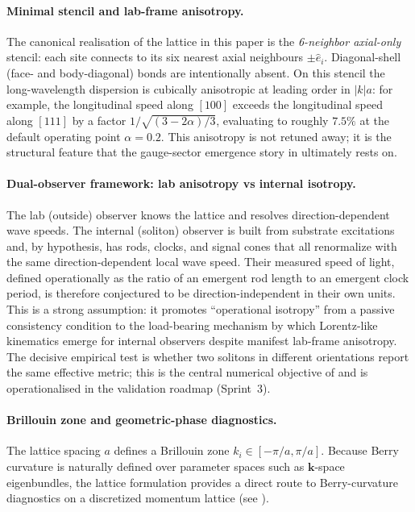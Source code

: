 \paragraph{Minimal stencil and lab-frame anisotropy.}
The canonical realisation of the lattice in this paper is the \emph{6-neighbor axial-only} stencil:
each site connects to its six nearest axial neighbours $\pm\hat{e}_i$.
Diagonal-shell (face- and body-diagonal) bonds are intentionally absent.
On this stencil the long-wavelength dispersion is cubically anisotropic at leading order in $|k|a$:
for example, the longitudinal speed along $[100]$ exceeds the longitudinal speed along $[111]$
by a factor $1/\sqrt{(3-2\alpha)/3}$, evaluating to roughly $7.5\%$ at the default operating point $\alpha=0.2$.
This anisotropy is not retuned away; it is the structural feature that the gauge-sector emergence story in
 ultimately rests on.

\paragraph{Dual-observer framework: lab anisotropy vs internal isotropy.}
\label{para:dual-observer}
The lab (outside) observer knows the lattice and resolves direction-dependent wave speeds.
The internal (soliton) observer is built from substrate excitations and, by hypothesis, has rods, clocks, and signal
cones that all renormalize with the same direction-dependent local wave speed.
Their measured speed of light, defined operationally as the ratio of an emergent rod length to an emergent clock period,
is therefore conjectured to be direction-independent in their own units.
This is a strong assumption: it promotes ``operational isotropy'' from a passive consistency condition to the
load-bearing mechanism by which Lorentz-like kinematics emerge for internal observers despite manifest lab-frame
anisotropy.
The decisive empirical test is whether two solitons in different orientations report the same effective metric;
this is the central numerical objective of  and is operationalised in the validation
roadmap (Sprint~3).

\paragraph{Brillouin zone and geometric-phase diagnostics.}
The lattice spacing $a$ defines a Brillouin zone $k_i\in[-\pi/a,\pi/a]$.
Because Berry curvature is naturally defined over parameter spaces such as $\mathbf{k}$-space eigenbundles,
the lattice formulation provides a direct route to Berry-curvature diagnostics on a discretized momentum lattice
(see ).

